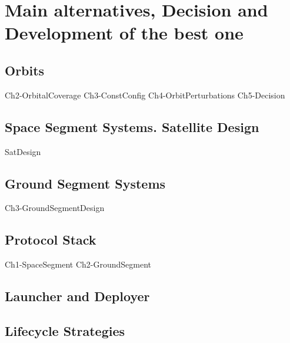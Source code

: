 \chapter{Main alternatives, Decision and Development of the best one}

\section{Orbits}
{Ch2-OrbitalCoverage}
{Ch3-ConstConfig}
{Ch4-OrbitPerturbations}
{Ch5-Decision}


\section{Space Segment Systems. Satellite Design}
{SatDesign}

\section{Ground Segment Systems}
{Ch3-GroundSegmentDesign}

\section{Protocol Stack}
{Ch1-SpaceSegment}
{Ch2-GroundSegment}

\section{Launcher and Deployer}

\section{Lifecycle Strategies}













